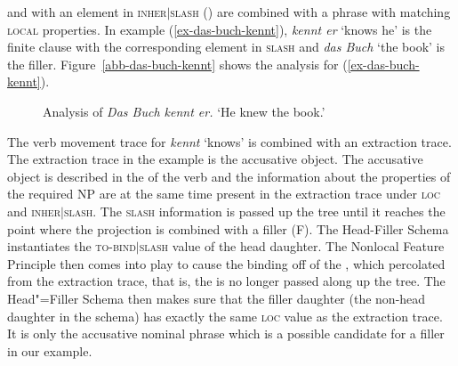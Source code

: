 and with an element in \textsc{inher$|$slash} () are combined with a phrase with matching \textsc{local} properties.
In example (\ref{ex-das-buch-kennt}), \emph{kennt er} `knows he' is the finite clause with the corresponding element in \textsc{slash}
and \emph{das Buch} `the book' is the filler. Figure~\vref{abb-das-buch-kennt} shows the analysis for (\ref{ex-das-buch-kennt}).
\begin{figure}
\caption{Analysis of \emph{Das Buch kennt er.} `He knew the book.'}\label{abb-das-buch-kennt}
\end{figure}


The verb movement trace for \emph{kennt} `knows' is combined with an extraction trace. 
The extraction trace in the example is the accusative object. The accusative object 
is described in the \compsl of the verb and the information about the properties
of the required NP are at the same time present in the extraction trace under \textsc{loc}
and \textsc{inher$|$slash}. The \textsc{slash} information is passed up the tree until it reaches
the point where the projection is combined with a filler (F). The Head-Filler Schema instantiates
the \textsc{to-bind$|$slash} value of the head daughter. The Nonlocal Feature Principle then comes into
play to cause the binding off of the \slashv, which percolated from the extraction trace, that is, the \slashv is no longer passed
along up the tree. The Head"=Filler Schema then makes sure that the filler daughter (the non-head daughter
in the schema) has exactly the same \textsc{loc} value as the extraction trace. It is only the accusative nominal
phrase which is a possible candidate for a filler in our example.


